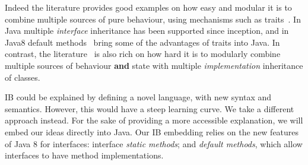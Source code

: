 Indeed the literature
provides good examples on how easy and modular it is to combine
multiple sources of pure behaviour, using mechanisms such as
traits~\cite{scharli03traits}. 
In Java multiple \emph{interface} inheritance has been
supported since inception, and in Java8 default methods~\cite{} bring some of
the advantages of traits into Java. In contrast, the literature~\cite{} is
also rich on how hard it is to modularly combine multiple sources of
behaviour \textbf{and} state with multiple \emph{implementation}
inheritance of classes. 












IB could be explained by defining a novel language, with new syntax
and semantics. However, this would have a steep learning curve.  We
take a different approach instead. For the sake of providing a more
accessible explanation, we will embed our ideas directly into Java. 
Our IB embedding relies on the
new features of Java 8 for interfaces: interface \emph{static methods}; and
\emph{default methods}, which allow interfaces to have method
implementations. 

